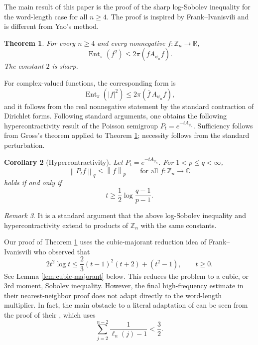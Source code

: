 \documentclass[11pt]{amsart}
\numberwithin{equation}{section}
\theoremstyle{plain}
\newtheorem{theorem}{Theorem}
\newtheorem{corollary}[theorem]{Corollary}
\theoremstyle{remark}
\newtheorem{remark}[theorem]{Remark}
\newcommand{\RR}{\mathbb R}
\newcommand{\CC}{\mathbb C}
\newcommand{\Zn}[1]{\mathbb Z_{#1}}
\newcommand{\psin}{\psi_n}
\newcommand{\Apsi}{A_{\psin}}
\newcommand{\Pt}{P_t}
\newcommand{\AvgSymbol}{\pi}
\newcommand{\Avg}[1]{\AvgSymbol\!\left(#1\right)}
\newcommand{\EntMeasure}{\pi}
\newcommand{\Ent}[1]{\operatorname{Ent}_{\EntMeasure}\!\left(#1\right)}
\newcommand{\norm}[1]{\left\|#1\right\|}
\begin{document}
The main result of this paper is the proof of the sharp log-Sobolev inequality for the word-length case for all $n\ge 4$. The proof is inspired by Frank--Ivanisvili and is different from Yao's method. 

\begin{theorem}\label{thm:main}
For every \(n\ge4\) and every nonnegative \(f:\Zn{n}\to\RR\),
\[
  \Ent{f^2}\le 2\Avg{f\Apsi f}.
\]
The constant \(2\) is sharp.
\end{theorem}

For complex-valued functions, the corresponding form is
\[
  \Ent{|f|^2}
  \le 2\Avg{\overline f\,\Apsi f},
\]
and it follows from the real nonnegative statement by the standard contraction
of Dirichlet forms.  Following standard arguments, one obtains the following
hypercontractivity result of the Poisson semigroup \(\Pt=e^{-t\Apsi}\).  Sufficiency follows from Gross's theorem
\cite{Gross1975} applied to Theorem \ref{thm:main}; necessity follows from the
standard perturbation.

\begin{corollary}[Hypercontractivity]\label{cor:hypercontractivity}
Let \(\Pt=e^{-t\Apsi}\).  For \(1<p\le q<\infty\),
\[
  \norm{\Pt f}_{q}\le \norm{f}_{p}\qquad \text{for all }f:\Zn{n}\to\CC
\]
holds if and only if
\[
  t\ge \frac12\log\frac{q-1}{p-1}.
\]
\end{corollary}


\begin{remark}
    It is a standard argument that the above log-Sobolev inequality and hypercontractivity extend to products of $\mathbb{Z}_n$ with the same constants. 
\end{remark}



Our proof of Theorem \ref{thm:main} uses the cubic-majorant reduction idea of Frank--Ivanisvili who observed that 
\[
  2t^2\log t
  \le
  \frac23(t-1)^2(t+2)+(t^2-1),\qquad t\ge 0.
\]
See Lemma \ref{lem:cubic-majorant} below. This reduces the problem to a cubic, or 3rd moment, Sobolev inequality. 
However, the final high-frequency estimate in their nearest-neighbor proof does not adapt directly to the word-length multiplier. In fact, the main obstacle to a literal adaptation of
\cite{FrankIvanisvili2026} can be seen from the proof of their \cite[Lemma 3]{FrankIvanisvili2026}, which uses 
\[
\sum_{j=2}^{n-2}\frac{1}{\ell_n(j)-1}<\frac{3}{2}.
\]
\end{document}
